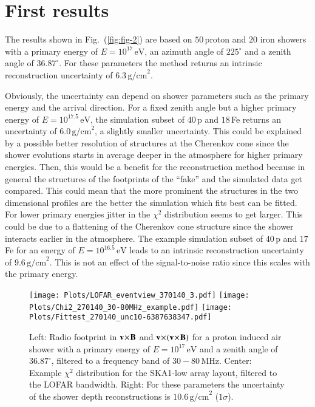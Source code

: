\documentclass[epj]{webofc}
\newcommand*{\figref}[1]{Fig.~(\ref{fig:#1})}
\newcommand*{\figlab}[1]{\label{fig:#1}}
\newcommand*{\seclab}[1]{\label{sec:#1}}
\begin{document}
\section{First results}\seclab{results}
\vspace{-0.17cm}
The results shown in \figref{fig-2} are based on $50\,$proton and $20$ iron showers with a primary energy of $E=10^{17}\,\mbox{eV}$, an azimuth angle of $225^\circ$ and a zenith angle of $36.87^\circ$. For these parameters the method returns an intrinsic reconstruction uncertainty of $6.3\,\mbox{g/cm}^2$.

Obviously, the uncertainty can depend on shower parameters such as the primary energy and the arrival direction.
For a fixed zenith angle but a higher primary energy of $E=10^{17.5}\,\mbox{eV}$, the simulation subset of $40\,$p and $18\,$Fe returns an uncertainty of $6.0\,\mbox{g/cm}^2$, a slightly smaller uncertainty. This could be explained by a possible better resolution of structures at the Cherenkov cone since the shower evolutions starts in average deeper in the atmosphere for higher primary energies. Then, this would be a benefit for the reconstruction method because in general the structures of the footprints of the ``fake'' and the simulated data get compared. This could mean that the more prominent the structures in the two dimensional profiles are the better the simulation which fits best can be fitted. 
For lower primary energies jitter in the $\chi^2$ distribution seems to get larger. This could be due to a flattening of the Cherenkov cone structure since the shower interacts earlier in the atmosphere. The example simulation subset of $40\,$p and $17\,$Fe for an energy of  $E=10^{16.5}\,\mbox{eV}$ leads to an intrinsic reconstruction uncertainty of $9.6\,\mbox{g/cm}^2$.
This is not an effect of the signal-to-noise ratio since this scales with the primary energy. 


\begin{figure}[tb]
\centering
\texttt{[image: Plots/LOFAR\_eventview\_370140\_3.pdf]}
\texttt{[image: Plots/Chi2\_270140\_30-80MHz\_example.pdf]}
\texttt{[image: Plots/Fittest\_270140\_unc10-6387638347.pdf]}
\caption{Left: Radio footprint in $\bf v\!\times\!\bf B$ and $\bf v\!\times\!(\bf v\!\times\!\bf B)$ for a proton induced air shower with a primary energy of $E=10^{17}\,\mbox{eV}$ and a zenith angle of $36.87^\circ$, filtered to a frequency band of $30-80\,\mbox{MHz}$. Center: Example $\chi^2$ distribution for the SKA1-low array layout, filtered to the LOFAR bandwidth. Right: For these parameters the uncertainty of the shower depth reconstructions is $10.6\,\mbox{g/cm}^2$ ($1\sigma$).}
\figlab{fig-3}       %
\end{figure}
\end{document}
